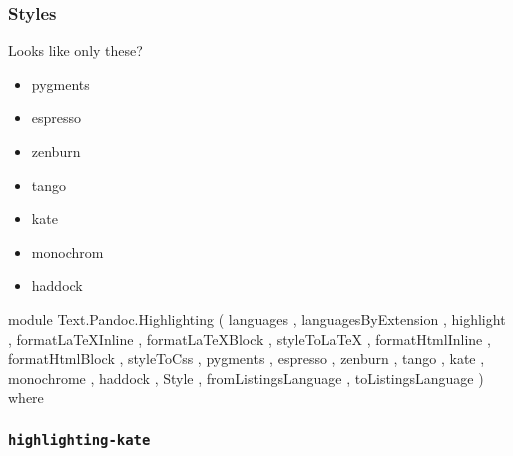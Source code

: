 \documentclass[letterpaper]{scrartcl}
\newenvironment{Shaded}{\begin{snugshade}}{\end{snugshade}}
\newcommand{\KeywordTok}[1]{\textcolor[rgb]{0.94,0.87,0.69}{{#1}}}
\newcommand{\DataTypeTok}[1]{\textcolor[rgb]{0.87,0.87,0.75}{{#1}}}
\newcommand{\NormalTok}[1]{\textcolor[rgb]{0.80,0.80,0.80}{{#1}}}
\begin{document}
\subsubsection{Styles}\label{styles}

Looks like only these?

\begin{itemize}
\itemsep1pt\parskip0pt
\item
  pygments
\item
  espresso
\item
  zenburn
\item
  tango
\item
  kate
\item
  monochrom
\item
  haddock
\end{itemize}

\begin{Shaded}
\begin{Highlighting}[]

\KeywordTok{module} \DataTypeTok{Text.Pandoc.Highlighting} \NormalTok{( languages}
                                \NormalTok{, languagesByExtension}
                                \NormalTok{, highlight}
                                \NormalTok{, formatLaTeXInline}
                                \NormalTok{, formatLaTeXBlock}
                                \NormalTok{, styleToLaTeX}
                                \NormalTok{, formatHtmlInline}
                                \NormalTok{, formatHtmlBlock}
                                \NormalTok{, styleToCss}
                                \NormalTok{, pygments}
                                \NormalTok{, espresso}
                                \NormalTok{, zenburn}
                                \NormalTok{, tango}
                                \NormalTok{, kate}
                                \NormalTok{, monochrome}
                                \NormalTok{, haddock}
                                \NormalTok{, }\DataTypeTok{Style}
                                \NormalTok{, fromListingsLanguage}
                                \NormalTok{, toListingsLanguage}
                                \NormalTok{) }\KeywordTok{where}
\end{Highlighting}
\end{Shaded}

\subsubsection{\texttt{highlighting-kate}}\label{highlighting-kate}
\end{document}
